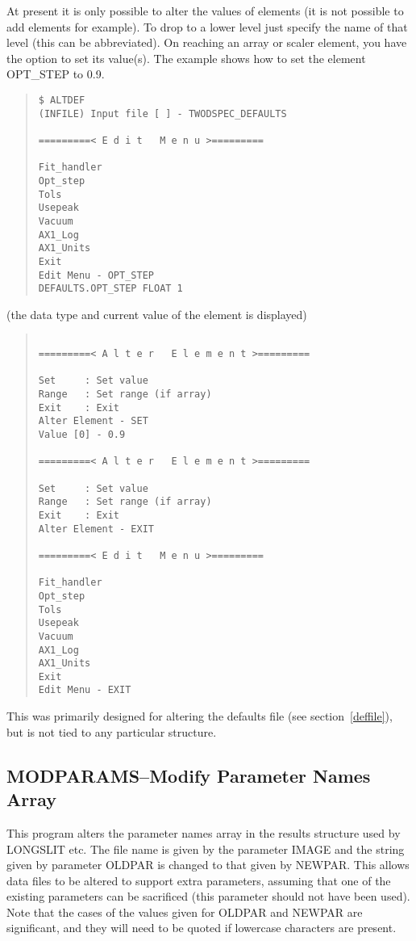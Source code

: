 At present it is only possible to alter the values of elements (it is
not possible to add elements for example).
To drop to a lower level just specify the name of that level (this can
be abbreviated).
On reaching an array or scaler element, you have the option to set its
value(s).
The example shows how to set the element OPT\_STEP to 0.9.
\begin{quote}\begin{verbatim}
$ ALTDEF 
(INFILE) Input file [ ] - TWODSPEC_DEFAULTS
 
=========< E d i t   M e n u >=========
 
Fit_handler
Opt_step
Tols
Usepeak
Vacuum
AX1_Log
AX1_Units
Exit
Edit Menu - OPT_STEP
DEFAULTS.OPT_STEP FLOAT 1
\end{verbatim}\end{quote}
(the data type and current value of the element is displayed)
\begin{quote}\begin{verbatim}
 
=========< A l t e r   E l e m e n t >=========
 
Set     : Set value
Range   : Set range (if array)
Exit    : Exit
Alter Element - SET
Value [0] - 0.9
 
=========< A l t e r   E l e m e n t >=========
 
Set     : Set value
Range   : Set range (if array)
Exit    : Exit
Alter Element - EXIT
 
=========< E d i t   M e n u >=========
 
Fit_handler
Opt_step
Tols
Usepeak
Vacuum
AX1_Log
AX1_Units
Exit
Edit Menu - EXIT
\end{verbatim}\end{quote}
This was primarily designed for altering the defaults file (see
section~\ref{deffile}), but is not tied to any particular structure.

\subsection{MODPARAMS--Modify Parameter Names Array}

This program alters the parameter names array in the results structure
used by LONGSLIT etc.
The file name is given by the parameter IMAGE and the string given by
parameter OLDPAR is changed to that given by NEWPAR.
This allows data files to be altered to support extra parameters,
assuming that one of the existing parameters can be sacrificed (this
parameter should not have been used).
Note that the cases of the values given for OLDPAR and NEWPAR are
significant, and they will need to be quoted if lowercase characters are
present.

